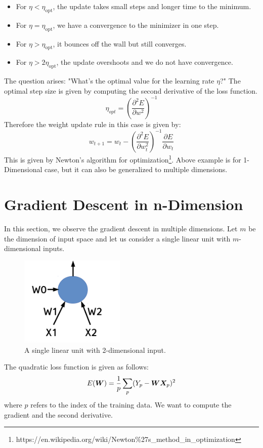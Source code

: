 \begin{itemize}
    \item For $\eta < \eta_{\textrm{opt}}$, the update takes small steps and longer time to the minimum.
    \item For $\eta=\eta_{\textrm{opt}}$, we have a convergence to the minimizer in one step.
    \item For $\eta > \eta_{\textrm{opt}}$, it bounces off the wall but still converges.
    \item For $\eta > 2 \eta_{\textrm{opt}}$, the update overshoots and we do not have convergence.
    
\end{itemize}

The question arises: "What's the optimal value for the learning rate $\eta$?" The optimal step size is given by computing the second derivative of the loss function.
$$ \eta_{opt} = (\frac{\partial^2 E}{\partial w^2})^{-1} $$
Therefore the weight update rule in this case is given by:
$$ w_{t+1} = w_t - (\frac{\partial^2 E}{\partial w_{t}^2})^{-1}\frac{\partial E}{\partial w_t}  $$
This is given by Newton's algorithm for optimization\footnote{https://en.wikipedia.org/wiki/Newton\%27s\_method\_in\_optimization}. Above example is for 1-Dimensional case, but it can also be generalized to multiple dimensions.


\section{Gradient Descent in n-Dimension}

In this section, we observe the gradient descent in multiple dimensions. Let $m$ be the dimension of input space and let us consider a single linear unit with $m$-dimensional inputs.
\begin{figure}[t]
\centering
\includegraphics[width=50mm]{lectures/07-a/su.png}
\caption{A single linear unit with 2-dimensional input.}
\end{figure}
The quadratic loss function is given as follows: 
$$ E(\vect{W})= \frac{1}{p}\sum_{p}(Y_{p} - \vect{W}\vect{X}_{p})^2$$
where $p$ refers to the index of the training data. We want to compute the gradient and the second derivative.

